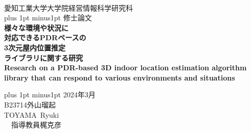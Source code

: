 \begin{titlepage}
    \begin{center}


        \ \vspace{19mm}

        \LARGE\baselineskip=13mm
        愛知工業大学大学院経営情報科学研究科 \\
        \kanjiskip=12pt plus 1pt minus1pt
        修士論文 \\[1mm]

        {\Huge\baselineskip=13mm
        \textbf{様々な環境や状況に\\対応できるPDRベースの\\3次元屋内位置推定\\ライブラリに関する研究} \\
        \textbf{
Research on a PDR-based 3D indoor location estimation algorithm library that can respond to various environments and situations} \\
        }

        \vspace{80mm}

        \kanjiskip=9pt plus 1pt minus1pt
        2024年3月 \\
        B23714\hspace{1zw}外山瑠起 \\
        TOYAMA\ Ryuki \\
        \ \hbox{\kanjiskip=0pt 指導教員}\hspace{1zw}梶克彦\hspace{1zw}

    \end{center}
\end{titlepage}
